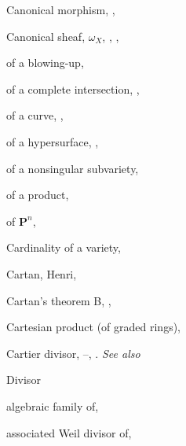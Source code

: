 {{\noindent\hspace*{0.0bp}Canonical morphism, , \par
\noindent\hspace*{0.0bp}Canonical sheaf, $\omega_X$, , , \par
\noindent\hspace*{7.5bp}of a blowing-up, \par
\noindent\hspace*{7.5bp}of a complete intersection, , \par
\noindent\hspace*{7.5bp}of a curve, , \par
\noindent\hspace*{7.5bp}of a hypersurface, , \par
\noindent\hspace*{7.5bp}of a nonsingular subvariety, \par
\noindent\hspace*{7.5bp}of a product, \par
\noindent\hspace*{7.5bp}of $\mathbf P^n$, \par
\noindent\hspace*{0.0bp}Cardinality of a variety, \par
\noindent\hspace*{0.0bp}Cartan, Henri, \par
\noindent\hspace*{0.0bp}Cartan's theorem B, , \par
\noindent\hspace*{0.0bp}Cartesian product (of graded rings), \par
\noindent\hspace*{0.0bp}Cartier divisor, --, . \emph{See also}\par
\noindent\hspace*{15.0bp}Divisor\par
\noindent\hspace*{7.5bp}algebraic family of, \par
\noindent\hspace*{7.5bp}associated Weil divisor of, \par
}}
